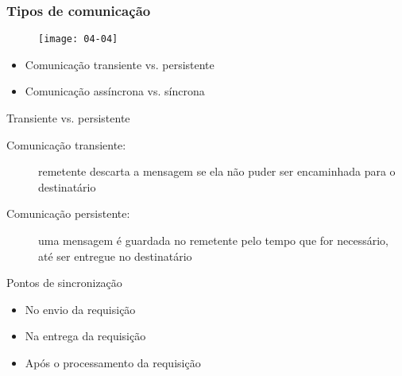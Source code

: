 \documentclass[Ligatures=TeX,table,brazil,svgnames,usetotalslideindicator,compress,10pt]{beamer}
\begin{document}
\begin{frame}
  \frametitle{Tipos de comunicação}

  \begin{figure}
    \centering
    \texttt{[image: 04-04]}
  \end{figure}

   \begin{overprint}

    \begin{itemize}
    \item Comunicação \alert{transiente} vs. \alert{persistente}
    \item Comunicação \alert{assíncrona} vs. \alert{síncrona}
    \end{itemize}

    \vspace{-1em}
    \begin{block}{Transiente vs. persistente}
      \begin{description}
      \item[Comunicação transiente:] remetente descarta a mensagem se ela não puder ser encaminhada para o destinatário
      \item[Comunicação persistente:] uma mensagem é guardada no remetente pelo tempo que for necessário, até ser entregue no destinatário
      \end{description}
    \end{block}

    \begin{block}{Pontos de sincronização}
      \begin{itemize}
      \item No envio da requisição
      \item Na entrega da requisição
      \item Após o processamento da requisição
      \end{itemize}
    \end{block}
  \end{overprint}

\end{frame}
\end{document}
